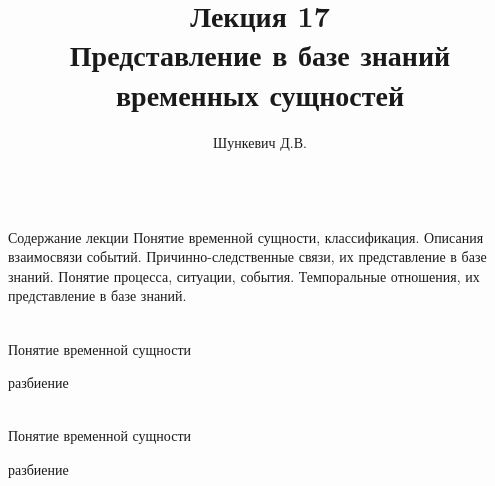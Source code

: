 \title{Лекция 17\\Представление в базе знаний временных сущностей}
\author[]{Шункевич Д.В.}

\begin{frame}
	\titlepage
\end{frame}

\begin{frame}{\\Содержание лекции}
	\topline
	\justifying
	Понятие временной сущности, классификация. Описания взаимосвязи событий. Причинно-следственные связи, их представление в базе знаний. Понятие процесса, ситуации, события. Темпоральные отношения, их представление в базе знаний.
\end{frame}

\begin{frame}{\\Понятие временной сущности}
	\topline
	\justifying
	\begin{scnrelfromset}{разбиение}
	\end{scnrelfromset}
\end{frame}

\begin{frame}{\\Понятие временной сущности}
	\topline
	\justifying
	\begin{scnrelfromset}{разбиение}
		\begin{scnindent}
		\end{scnindent}
	\end{scnrelfromset}
\end{frame}

